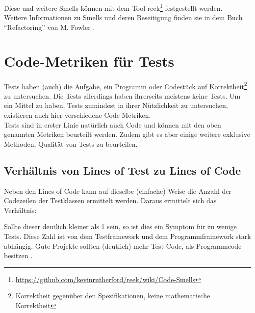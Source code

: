 Diese und weitere Smells können mit dem Tool reek\footnote{\url{https://github.com/kevinrutherford/reek/wiki/Code-Smells}} festgestellt werden.\\
Weitere Informationen zu Smells und deren Beseitigung finden sie in dem Buch "`Refactoring"' von M. Fowler \citep{fowler_refactoring_1999}.

\section{Code-Metriken für Tests}
\label{sec:metrics}
Tests haben (auch) die Aufgabe, ein Programm oder Codestück auf Korrektheit\footnote{Korrektheit gegenüber den Spezifikationen, keine mathematische Korrektheit} zu untersuchen. Die Tests allerdings haben ihrerseits meistens keine Tests. Um ein Mittel zu haben, Tests zumindest in ihrer Nützlichkeit zu untersuchen, existieren auch hier verschiedene Code-Metriken.\\
Tests sind in erster Linie natürlich auch Code und können mit den oben genannten Metriken beurteilt werden. Zudem gibt es aber einige weitere exklusive Methoden, Qualität von Tests zu beurteilen.

\subsection{Verhältnis von Lines of Test zu Lines of Code}
Neben den Lines of Code kann auf dieselbe (einfache) Weise die Anzahl der Codezeilen der Testklassen ermittelt werden. Daraus ermittelt sich das Verhältnis:


Sollte dieser deutlich kleiner als 1 sein, so ist dies ein Symptom für zu wenige Tests. Diese Zahl ist von dem Testframework und dem Programmframework stark abhängig. Gute Projekte sollten (deutlich) mehr Test-Code, als Programmcode besitzen \citep[S. 238]{hunt_pragmatic_1999}.

